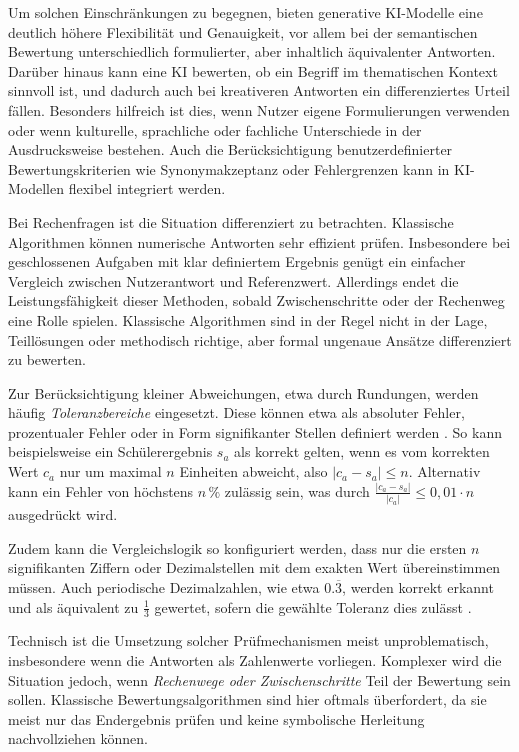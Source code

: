 \documentclass[a4paper,12pt]{article}
\begin{document}
Um solchen Einschränkungen zu begegnen, bieten generative KI-Modelle eine deutlich höhere Flexibilität und Genauigkeit, vor allem bei der semantischen Bewertung unterschiedlich formulierter, aber inhaltlich äquivalenter Antworten. Darüber hinaus kann eine KI bewerten, ob ein Begriff im thematischen Kontext sinnvoll ist, und dadurch auch bei kreativeren Antworten ein differenziertes Urteil fällen. Besonders hilfreich ist dies, wenn Nutzer eigene Formulierungen verwenden oder wenn kulturelle, sprachliche oder fachliche Unterschiede in der Ausdrucksweise bestehen. Auch die Berücksichtigung benutzerdefinierter Bewertungskriterien wie Synonymakzeptanz oder Fehlergrenzen kann in KI-Modellen flexibel integriert werden.


Bei Rechenfragen ist die Situation differenziert zu betrachten. Klassische Algorithmen können numerische Antworten sehr effizient prüfen. Insbesondere bei geschlossenen Aufgaben mit klar definiertem Ergebnis genügt ein einfacher Vergleich zwischen Nutzerantwort und Referenzwert. Allerdings endet die Leistungsfähigkeit dieser Methoden, sobald Zwischenschritte oder der Rechenweg eine Rolle spielen. Klassische Algorithmen sind in der Regel nicht in der Lage, Teillösungen oder methodisch richtige, aber formal ungenaue Ansätze differenziert zu bewerten.

Zur Berücksichtigung kleiner Abweichungen, etwa durch Rundungen, werden häufig \textit{Toleranzbereiche} eingesetzt. Diese können etwa als absoluter Fehler, prozentualer Fehler oder in Form signifikanter Stellen definiert werden \parencite{calcme}. So kann beispielsweise ein Schülerergebnis $s_a$ als korrekt gelten, wenn es vom korrekten Wert $c_a$ nur um maximal $n$ Einheiten abweicht, also $|c_a - s_a| \leq n$. Alternativ kann ein Fehler von höchstens $n\,\%$ zulässig sein, was durch $\frac{|c_a - s_a|}{|c_a|} \leq 0{,}01 \cdot n$ ausgedrückt wird.

Zudem kann die Vergleichslogik so konfiguriert werden, dass nur die ersten $n$ signifikanten Ziffern oder Dezimalstellen mit dem exakten Wert übereinstimmen müssen. Auch periodische Dezimalzahlen, wie etwa $0.\overline{3}$, werden korrekt erkannt und als äquivalent zu $\frac{1}{3}$ gewertet, sofern die gewählte Toleranz dies zulässt \parencite{calcme}.

Technisch ist die Umsetzung solcher Prüfmechanismen meist unproblematisch, insbesondere wenn die Antworten als Zahlenwerte vorliegen. Komplexer wird die Situation jedoch, wenn \textit{Rechenwege oder Zwischenschritte} Teil der Bewertung sein sollen. Klassische Bewertungsalgorithmen sind hier oftmals überfordert, da sie meist nur das Endergebnis prüfen und keine symbolische Herleitung nachvollziehen können.
\end{document}
